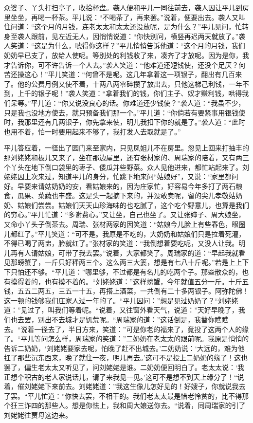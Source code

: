 \documentclass[12pt,oneside]{book}
\begin{document}
众婆子、丫头打扫亭子，收拾杯盘。袭人便和平儿一同往前去，袭人因让平儿到房里坐坐，再喝一杯茶。平儿说：“不喝茶了，再来罢。”说着，便要出去。袭人又叫住问道：“这个月的月钱，连老太太和太太还没放呢，是为什么？”平儿见问，忙转身至袭人跟前，见左近无人，因悄悄说道：“你快别问，横竖再迟两天就放了。”袭人笑道：“这是为什么，唬得你这样？”平儿悄悄告诉他道：“这个月的月钱，我们奶奶早已支了，放给人使呢。等别处的利钱收了来，凑齐了才放呢。因为是你，我才告诉你，可不许告诉一个人去。”袭人笑道：“他难道还短钱使，还没个足厌？何苦还操这心！”平儿笑道：“何曾不是呢。这几年拿着这一项银子，翻出有几百来了。他的公费月例又使不着，十两八两零碎攒了放出去，只他这梯己利钱，一年不到，上千的银子呢！”袭人笑道：“拿着我们的钱，你们主子、奴才赚利钱，哄得我们呆等。”平儿道：“你又说没良心的话。你难道还少钱使？”袭人道：“我虽不少，只是我也没地方使去，就只预备我们那一个。”平儿道：“你倘若有要紧事用银钱使时，我那里还有几两银子，你先拿来使，明儿我扣下你的就是了。”袭人道：“此时也用不着，怕一时要用起来不够了，我打发人去取就是了。”

平儿答应着，一径出了园门来至家内，只见凤姐儿不在房里。忽见上回来打抽丰的那刘姥姥和板儿又来了，坐在那边屋里，还有张材家的、周瑞家的陪着，又有两三个丫头在地下倒口袋里的枣子、倭瓜并些野菜。众人见他进来，都忙站起来了。刘姥姥因上次来过，知道平儿的身分，忙跳下地来问“姑娘好”，又说：“家里都问好。早要来请姑奶奶的安，看姑娘来的，因为庄家忙，好容易今年多打了两石粮食，瓜果、菜蔬也丰盛。这是头一起摘下来的，并没敢卖呢，留的尖儿孝敬姑奶奶、姑娘们尝尝。姑娘们天天山珍海味的也吃腻了，这个吃个野意儿，也算是我们的穷心。”平儿忙道：“多谢费心。”又让坐，自己也坐了。又让张婶子、周大娘坐，又命小丫头子倒茶去。周瑞、张材两家的因笑道：“姑娘今儿脸上有些春色，眼圈儿都红了。”平儿笑道：“可不是。我原是不吃的，大奶奶和姑娘们只是拉着死灌，不得已喝了两盅，脸就红了。”张材家的笑道：“我倒想着要吃呢，又没人让我。明儿再有人请姑娘，可带了我去罢。”说着，大家都笑了。周瑞家的道：“早起我就看见那螃蟹了，一斤只好秤两三个。这么两三大篓，想是有七八十斤呢。”若是上上下下只怕还不够。“平儿道：”哪里够，不过都是有名儿的吃两个子。那些散众的，也有摸得着的，也有摸不着的。“刘姥姥道：”这样螃蟹，今年就值五分一斤。十斤五钱，五五二两五，三五一十五，再搭上酒菜，一共倒有二十多两银子。阿弥陀佛！这一顿的钱够我们庄家人过一年的了。“平儿因问：”想是见过奶奶了？“刘姥姥道：”见过了，叫我们等着呢。“说着，又往窗外看天气，说道：”天好早晚了，我们也去罢，别出不去城才是饥荒呢。“周瑞家的道：”这话倒是，我替你瞧瞧去。“说着一径去了，半日方来，笑道：”可是你老的福来了，竟投了这两个人的缘了。“平儿等问怎么样，周瑞家的笑道：”二奶奶在老太太的跟前呢。我原是悄悄的告诉二奶奶，‘刘姥姥要家去呢，怕晚了赶不出城去。’二奶奶说：‘大远的，难为他扛了那些沉东西来，晚了就住一夜，明儿再去。’这可不是投上二奶奶的缘了！这也罢了，偏生老太太又听见了，问刘姥姥是谁。二奶奶便回明白了。老太太说：‘我正想个积古的老人家说话儿，请了来我见一见。’这可不是想不到天上缘分了！“说着，催刘姥姥下来前去。刘姥姥道：”我这生像儿怎好见的！好嫂子，你就说我去了罢。“平儿忙道：”你快去罢，不相干的。我们老太太最是惜老怜贫的，比不得那个狂三诈四的那些人。想是你怯上，我和周大娘送你去。“说着，同周瑞家的引了刘姥姥往贾母这边来。
\end{document}
